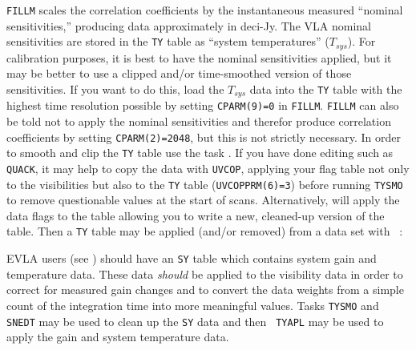 {\tt FILLM} scales the correlation coefficients by the instantaneous
measured ``nominal sensitivities,'' producing data approximately in
deci-Jy.   The VLA nominal sensitivities are stored in the {\tt TY}
table as ``system temperatures'' ($T_{sys}$)\@.  For calibration
purposes, it is best to have the nominal sensitivities applied, but it
may be better to use a clipped and/or time-smoothed version of those
sensitivities.  If you want to do this, load the $T_{sys}$ data into
the {\tt TY} table with the highest time resolution possible by
setting {\tt CPARM(9)=0} in {\tt FILLM}\@.  {\tt FILLM} can also be
told not to apply the nominal sensitivities and therefor produce
correlation coefficients by setting {\tt CPARM(2)=2048}, but this is
not strictly necessary.  In order to smooth and clip the {\tt TY}
table use the task {\tt {}}\@.  If you have done editing
such as {\tt QUACK}, it may help to copy the data with {\tt UVCOP},
applying your flag table not only to the visibilities but also to the
{\tt TY} table ({\tt UVCOPPRM(6)=3}) before running {\tt TYSMO} to
remove questionable values at the start of scans.  Alternatively,
{\tt {}} will apply the data flags to the table allowing you
to write a new, cleaned-up version of the table.  Then a {\tt TY}
table may be applied (and/or removed) from a data set with {\tt
{}}\@:

EVLA users (see ) should have an {\tt SY} table which
contains system gain and temperature data.  These data {\it should} be
applied to the visibility data in order to correct for measured gain
changes and to convert the data weights from a simple count of the
integration time into more meaningful values.  Tasks {\tt TYSMO} and
{\tt SNEDT} may be used to clean up the {\tt SY} data and then {\tt
TYAPL} may be used to apply the gain and system temperature data.


